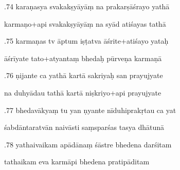 \documentclass[article,12pt,a4paper]{memoir}%
\newcounter{parCount}
\begin{document}
	  
	  \pstart {}.74 karaṇasya svakakṣyāyāṃ na prakarṣāśrayo yathā 
	{}
	\pend%
      

	  
	  \pstart \leavevmode%
	karmaṇo+api svakakṣyāyāṃ na syād atiśayas tathā 
	{}
	\pend%
      

	  
	  \pstart {}.75 karmaṇas tv āptum iṣṭatva āśrite+atiśayo yataḥ 
	{}
	\pend%
      

	  
	  \pstart \leavevmode%
	āśrīyate tato+atyantaṃ bhedaḥ pūrveṇa karmaṇā 
	{}
	\pend%
      

	  
	  \pstart {}.76 ṇijante ca yathā kartā sakriyaḥ san prayujyate 
	{}
	\pend%
      

	  
	  \pstart \leavevmode%
	na duhyādau tathā kartā niṣkriyo+api prayujyate 
	{}
	\pend%
      

	  
	  \pstart {}.77 bhedavākyaṃ tu yan ṇyante nīduhiprakṛtau ca yat 
	{}
	\pend%
      

	  
	  \pstart \leavevmode%
	śabdāntaratvān naivāsti saṃsparśas tasya dhātunā 
	{}
	\pend%
      

	  
	  \pstart {}.78 yathaivaikam apādānaṃ śāstre bhedena darśitam 
	{}
	\pend%
      

	  
	  \pstart \leavevmode%
	tathaikam eva karmāpi bhedena pratipāditam 
	{}
	\pend%
      
\end{document}
